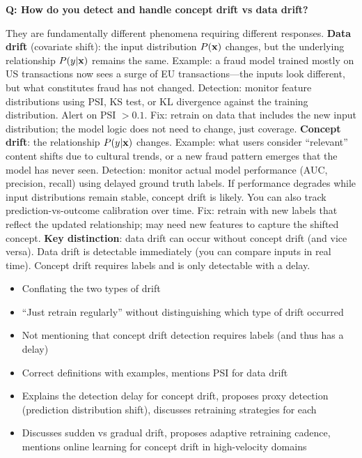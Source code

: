 \begin{interviewq}
\textbf{Q: How do you detect and handle concept drift vs data drift?}

 \quad {} \quad \badgefreq{\freqmed}

\stronganswer They are fundamentally different phenomena requiring different responses. \textbf{Data drift} (covariate shift): the input distribution $P(\mathbf{x})$ changes, but the underlying relationship $P(y|\mathbf{x})$ remains the same. Example: a fraud model trained mostly on US transactions now sees a surge of EU transactions---the inputs look different, but what constitutes fraud has not changed. Detection: monitor feature distributions using PSI, KS test, or KL divergence against the training distribution. Alert on PSI $> 0.1$. Fix: retrain on data that includes the new input distribution; the model logic does not need to change, just coverage. \textbf{Concept drift}: the relationship $P(y|\mathbf{x})$ changes. Example: what users consider ``relevant'' content shifts due to cultural trends, or a new fraud pattern emerges that the model has never seen. Detection: monitor actual model performance (AUC, precision, recall) using delayed ground truth labels. If performance degrades while input distributions remain stable, concept drift is likely. You can also track prediction-vs-outcome calibration over time. Fix: retrain with new labels that reflect the updated relationship; may need new features to capture the shifted concept. \textbf{Key distinction}: data drift can occur without concept drift (and vice versa). Data drift is detectable immediately (you can compare inputs in real time). Concept drift requires labels and is only detectable with a delay.

\redflags
\begin{itemize}
    \item Conflating the two types of drift
    \item ``Just retrain regularly'' without distinguishing which type of drift occurred
    \item Not mentioning that concept drift detection requires labels (and thus has a delay)
\end{itemize}


\goodgreat
\begin{itemize}
    \item {} Correct definitions with examples, mentions PSI for data drift
    \item {} Explains the detection delay for concept drift, proposes proxy detection (prediction distribution shift), discusses retraining strategies for each
    \item {} Discusses sudden vs gradual drift, proposes adaptive retraining cadence, mentions online learning for concept drift in high-velocity domains
\end{itemize}


\end{interviewq}
